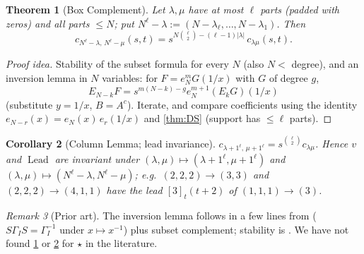 \documentclass[submission]{FPSAC2027}
\newtheorem{theorem}{Theorem}[section]
\newtheorem{corollary}[theorem]{Corollary}
\theoremstyle{definition}
\theoremstyle{remark}
\newtheorem{remark}[theorem]{Remark}
\newcommand{\Lead}{\operatorname{Lead}}
\newcommand{\val}{v}
\begin{document}
\begin{theorem}[Box Complement]\label{thm:box}
Let $\lambda,\mu$ have at most $\ell$ parts (padded with zeros) and all parts $\le N$; put $N^\ell-\lambda:=(N-\lambda_\ell,\dots,N-\lambda_1)$. Then
\[ c_{N^\ell-\lambda,\,N^\ell-\mu}(s,t)=s^{N\binom{\ell}{2}-(\ell-1)|\lambda|}\,c_{\lambda\mu}(s,t). \]
\end{theorem}
\begin{proof}[Proof idea]
Stability of the subset formula for every $N$ (also $N<$ degree), and an inversion lemma in $N$ variables: for $F=e_N^mG(1/x)$ with $G$ of degree $g$, \[E_{N-k}F=s^{m(N-k)-g}e_N^{m+1}(E_kG)(1/x)\] (substitute $y=1/x$, $B=A^c$). Iterate, and compare coefficients using the identity $e_{N-r}(x)=e_N(x)\,e_r(1/x)$ and \cref{thm:DS} (support has $\le\ell$ parts).
\end{proof}
\begin{corollary}[Column Lemma; lead invariance]\label{cor:column}
$c_{\lambda+1^\ell,\,\mu+1^\ell}=s^{\binom{\ell}{2}}c_{\lambda\mu}$. Hence $\val$ and $\Lead$ are invariant under $(\lambda,\mu)\mapsto(\lambda+1^\ell,\mu+1^\ell)$ and $(\lambda,\mu)\mapsto(N^\ell-\lambda,N^\ell-\mu)$; e.g.\ $(2,2,2)\to(3,3)$ and $(2,2,2)\to(4,1,1)$ have the lead $[3]_t(t+2)$ of $(1,1,1)\to(3)$.
\end{corollary}
\begin{remark}[Prior art]
The inversion lemma follows in a few lines from \cite[Rem.~3.3]{DFK19} ($S\Gamma_IS=\Gamma_I^{-1}$ under $x\mapsto x^{-1}$) plus subset complement; stability is \cite[Prop.~3.8, Cor.~3.10]{Hikita25}. We have not found \cref{thm:box} or \cref{cor:column} for $\star$ in the literature.
\end{remark}
\end{document}
